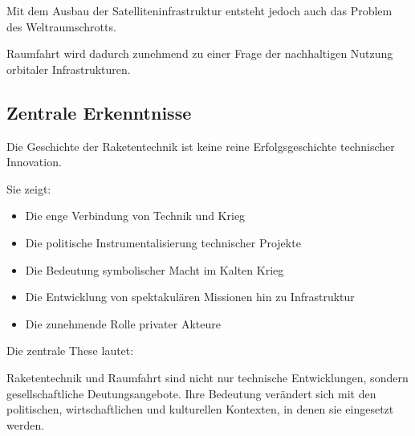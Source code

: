 Mit dem Ausbau der Satelliteninfrastruktur
entsteht jedoch auch das Problem des Weltraumschrotts.

Raumfahrt wird dadurch zunehmend zu einer Frage
der nachhaltigen Nutzung orbitaler Infrastrukturen.

\subsection{Zentrale Erkenntnisse}

Die Geschichte der Raketentechnik ist keine reine Erfolgsgeschichte
technischer Innovation.

Sie zeigt:

\begin{itemize}
    \item Die enge Verbindung von Technik und Krieg
    \item Die politische Instrumentalisierung technischer Projekte
    \item Die Bedeutung symbolischer Macht im Kalten Krieg
    \item Die Entwicklung von spektakulären Missionen hin zu Infrastruktur
    \item Die zunehmende Rolle privater Akteure
\end{itemize}

Die zentrale These lautet:

Raketentechnik und Raumfahrt sind nicht nur technische Entwicklungen,
sondern gesellschaftliche Deutungsangebote.
Ihre Bedeutung verändert sich mit den politischen,
wirtschaftlichen und kulturellen Kontexten, in denen sie eingesetzt werden.